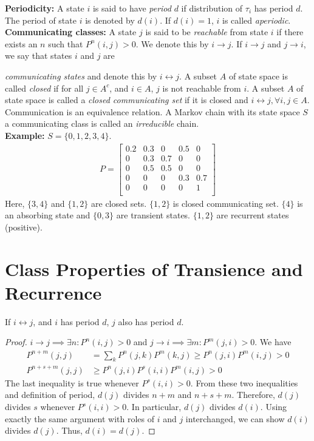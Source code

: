 \documentclass[all-lectures.tex]{subfiles}
\begin{document}
\textbf{Periodicity:} A state $i$ is said to have \textit{period} $d$ if distribution of $\tau_i$ has period $d$. The period of state $i$ is denoted by $d(i)$. If $d(i)=1$, $i$ is called \textit{aperiodic}. \\

\textbf{Communicating classes:} A state $j$ is said to be \textit{reachable} from state $i$ if there exists an $n$ such that $P^n(i,j) > 0$. We denote this by $i\rightarrow j$. If $i\rightarrow j$  and $j \rightarrow i$, we say that states $i$ and $j$ are 

\textit{communicating states} and denote this by $i \leftrightarrow j$. A subset $A$ of state space is called \textit{closed} if for all $j \in A^c$, and $i \in A$, $j$ is not reachable from $i$. A subset $A$ of state space is called a \textit{closed communicating set} if it is closed and $i \leftrightarrow j, \forall i,j \in A$. Communication is an equivalence relation. A Markov chain with its state space $S$ a communicating class is called an \textit{irreducible} chain.\\

\textbf{Example:} $S = \{0,1,2,3,4\}$.
\begin{align*}
	P = 
\begin{bmatrix}
	0.2      & 0.3 & 0 & 0.5 & 0  \\
    0      & 0.3 & 0.7 & 0 & 0 \\
	0      & 0.5 & 0.5 & 0 & 0  \\
   0      & 0 & 0 & 0.3 & 0.7  \\
    0      & 0 & 0 & 0 & 1 \\
\end{bmatrix}
\end{align*}
Here, $\{3,4\}$ and $\{1,2\}$ are closed sets. $\{1,2\}$ is closed communicating set. $\{4\}$ is an absorbing state and $\{0,3\}$ are transient states. $\{1,2\}$ are recurrent states (positive).
\section{Class Properties of Transience and Recurrence}
\begin{prop} \label{prop:periodicity_is_class_property}
If $i\leftrightarrow j$, and $i$ has period $d$, $j$ also has period $d$.
\begin{proof}
$i \rightarrow j \implies \exists n : P^n(i,j) > 0$ and $ j \rightarrow i \implies \exists m : P^m(j,i) > 0$. 
We have 
\begin{align*}
P^{n+m}(j,j) &= \sum_k P^n(j,k) P^m(k,j) \geq P^n(j,i) P^m(i,j) > 0 \\
P^{n+s+m}(j,j)  &\geq P^n(j,i) P^s(i,i) P^m(i,j) > 0
\end{align*}
The last inequality is true whenever $P^s(i,i) > 0$. From these two inequalities and definition of period, $d(j)$ divides $n+m$ and $n+s+m$. Therefore, $d(j)$ divides $s$ whenever $P^s(i,i) > 0$. In particular, $d(j)$ divides $d(i)$. Using exactly the same argument with roles of $i$ and $j$ interchanged, we can show $d(i)$ divides $d(j)$. Thus, $d(i) = d(j)$. \qedhere 
\end{proof}
\end{prop}
\end{document}
